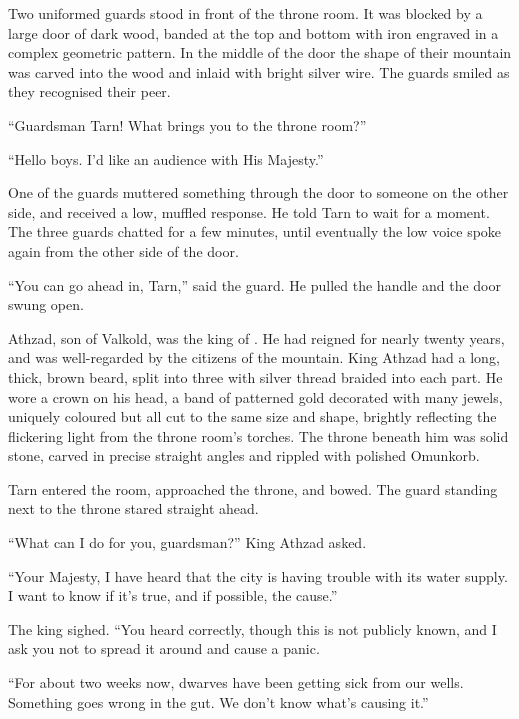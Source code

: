 \divider


Two uniformed guards stood in front of the throne room.  It was blocked by a large door of dark wood, banded at the top and bottom with iron engraved in a complex geometric pattern.  In the middle of the door the shape of their mountain was carved into the wood and inlaid with bright silver wire.  The guards smiled as they recognised their peer.

``Guardsman Tarn!  What brings you to the throne room?''

``Hello boys.  I'd like an audience with His Majesty.''

One of the guards muttered something through the door to someone on the other side, and received a low, muffled response.  He told Tarn to wait for a moment.  The three guards chatted for a few minutes, until eventually the low voice spoke again from the other side of the door.

``You can go ahead in, Tarn,'' said the guard.  He pulled the handle and the door swung open.

Athzad, son of Valkold, was the king of \korbarthrond.  He had reigned for nearly twenty years, and was well-regarded by the citizens of the mountain.  King Athzad had a long, thick, brown beard, split into three with silver thread braided into each part.  He wore a crown on his head, a band of patterned gold decorated with many jewels, uniquely coloured but all cut to the same size and shape, brightly reflecting the flickering light from the throne room's torches.  The throne beneath him was solid stone, carved in precise straight angles and rippled with polished Omunkorb.

Tarn entered the room, approached the throne, and bowed.  The guard standing next to the throne stared straight ahead.

``What can I do for you, guardsman?'' King Athzad asked.

``Your Majesty, I have heard that the city is having trouble with its water supply.  I want to know if it's true, and if possible, the cause.''

The king sighed.  ``You heard correctly, though this is not publicly known, and I ask you not to spread it around and cause a panic.

``For about two weeks now, dwarves have been getting sick from our wells.  Something goes wrong in the gut.  We don't know what's causing it.''

